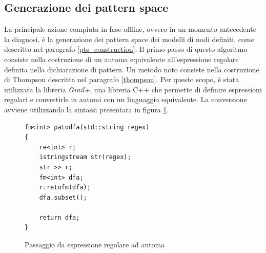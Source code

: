 \subsection{Generazione dei pattern space}
La principale azione compiuta in fase offline, ovvero in un momento antecedente la diagnosi, è la generazione dei pattern space dei modelli di nodi definiti, come descritto nel paragrafo \ref{pts_construction}. 
Il primo passo di questo algoritmo consiste nella costruzione di un automa equivalente all'espressione regolare definita nella dichiarazione di pattern. Un metodo noto consiste nella costruzione di Thompson descritta nel paragrafo \ref{thompson}. 
Per questo scopo, è stata utilizzata la libreria \emph{Grail+}\cite{web:grail}, una libreria C++ che permette di definire espressioni regolari e convertirle in automi con un linguaggio equivalente.
La conversione avviene utilizzando la sintassi presentata in figura \ref{code:patodfa}.

\begin{figure}[htbp]
\begin{verbatim}
fm<int> patodfa(std::string regex)
{
    re<int> r;
    istringstream str(regex);
    str >> r;
    fm<int> dfa;
    r.retofm(dfa);
    dfa.subset();

    return dfa;
}
\end{verbatim}
\caption{Passaggio da espressione regolare ad automa}
\label{code:patodfa}
\end{figure}

